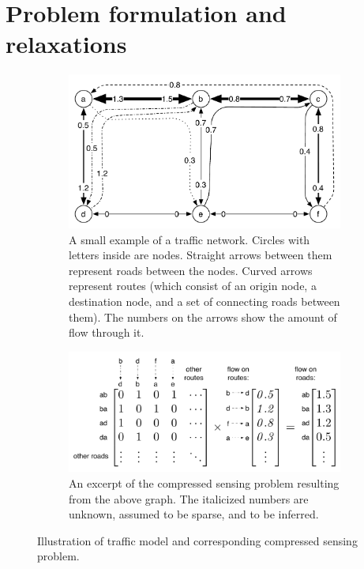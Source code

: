 \documentclass{article} %
\begin{document}
\section{Problem formulation and relaxations}
\begin{figure}[t]
  \centering
  \begin{subfigure}[h]{0.8\textwidth}
    \includegraphics[width=\textwidth]{figures/road-network-graph.pdf}
    \caption{A small example of a traffic network. Circles with letters inside
      are nodes. Straight arrows between them represent roads between the
      nodes. Curved arrows represent routes (which consist of an origin node, a
      destination node, and a set of connecting roads between them). The numbers
      on the arrows show the amount of flow through it.}
  \end{subfigure}
  \begin{subfigure}[h]{0.8\textwidth}
    \includegraphics[width=\textwidth]{figures/road-network-matrix.pdf}
    \caption{An excerpt of the compressed sensing problem resulting from the
      above graph. The italicized numbers are unknown, assumed to be sparse,
      and to be inferred.}
  \end{subfigure}
  \caption{Illustration of traffic model and corresponding compressed sensing problem.}
\end{figure}
\end{document}
